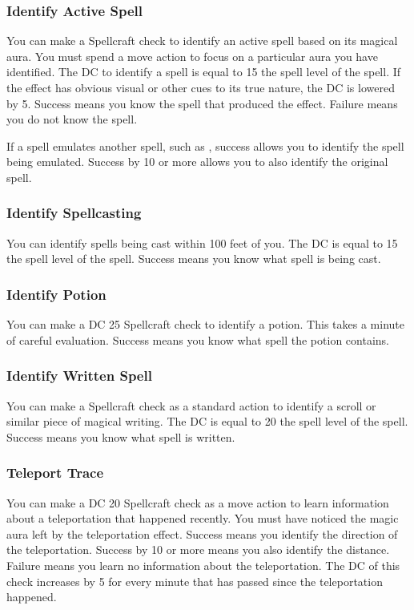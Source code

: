 \subsubsection{Identify Active Spell}
You can make a Spellcraft check to identify an active spell based on its magical aura. You must spend a move action to focus on a particular aura you have identified. The DC to identify a spell is equal to 15 \add the spell level of the spell.  If the effect has obvious visual or other cues to its true nature, the DC is lowered by 5. Success means you know the spell that produced the effect. Failure means you do not know the spell.

If a spell emulates another spell, such as , success allows you to identify the spell being emulated. Success by 10 or more allows you to also identify the original spell.

\subsubsection{Identify Spellcasting}
You can identify spells being cast within 100 feet of you. The DC is equal to 15 \add the spell level of the spell. Success means you know what spell is being cast.

\subsubsection{Identify Potion}
You can make a DC 25 Spellcraft check to identify a potion. This takes a minute of careful evaluation. Success means you know what spell the potion contains.

\subsubsection{Identify Written Spell}
You can make a Spellcraft check as a standard action to identify a scroll or similar piece of magical writing. The DC is equal to 20 \add the spell level of the spell. Success means you know what spell is written.

\subsubsection{Teleport Trace}
You can make a DC 20 Spellcraft check as a move action to learn information about a teleportation that happened recently. You must have noticed the magic aura left by the teleportation effect. Success means you identify the direction of the teleportation. Success by 10 or more means you also identify the distance. Failure means you learn no information about the teleportation. The DC of this check increases by 5 for every minute that has passed since the teleportation happened.

